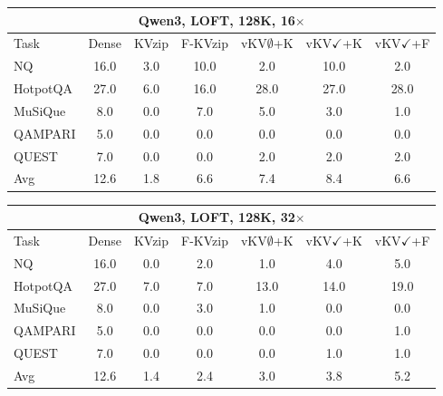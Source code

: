 \begin{tabular}{lcccccc}
\toprule
\multicolumn{7}{c}{Qwen3, LOFT, 128K, 16$\times$} \\
\midrule
Task & Dense & KVzip & F-KVzip & vKV$\emptyset$+K & vKV$\checkmark$+K & vKV$\checkmark$+F \\
\midrule
NQ & 16.0 & 3.0 & 10.0 & 2.0 & 10.0 & 2.0 \\
HotpotQA & 27.0 & 6.0 & 16.0 & 28.0 & 27.0 & 28.0 \\
MuSiQue & 8.0 & 0.0 & 7.0 & 5.0 & 3.0 & 1.0 \\
QAMPARI & 5.0 & 0.0 & 0.0 & 0.0 & 0.0 & 0.0 \\
QUEST & 7.0 & 0.0 & 0.0 & 2.0 & 2.0 & 2.0 \\
\midrule
Avg & 12.6 & 1.8 & 6.6 & 7.4 & 8.4 & 6.6 \\
\bottomrule
\end{tabular}
\vspace{0.8em}

\begin{tabular}{lcccccc}
\toprule
\multicolumn{7}{c}{Qwen3, LOFT, 128K, 32$\times$} \\
\midrule
Task & Dense & KVzip & F-KVzip & vKV$\emptyset$+K & vKV$\checkmark$+K & vKV$\checkmark$+F \\
\midrule
NQ & 16.0 & 0.0 & 2.0 & 1.0 & 4.0 & 5.0 \\
HotpotQA & 27.0 & 7.0 & 7.0 & 13.0 & 14.0 & 19.0 \\
MuSiQue & 8.0 & 0.0 & 3.0 & 1.0 & 0.0 & 0.0 \\
QAMPARI & 5.0 & 0.0 & 0.0 & 0.0 & 0.0 & 1.0 \\
QUEST & 7.0 & 0.0 & 0.0 & 0.0 & 1.0 & 1.0 \\
\midrule
Avg & 12.6 & 1.4 & 2.4 & 3.0 & 3.8 & 5.2 \\
\bottomrule
\end{tabular}
\vspace{0.8em}

